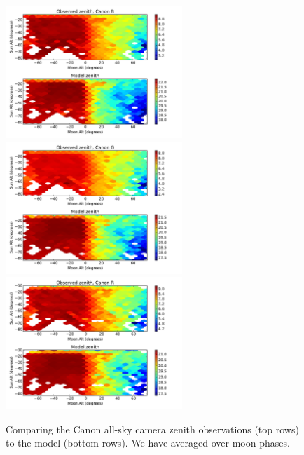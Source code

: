 \documentclass[]{spie}
\begin{document}
\begin{figure}[ht]
  \begin{center}
  \includegraphics[height=5cm]{plots/simple_zenith_comp_B.pdf} 
  \includegraphics[height=5cm]{plots/simple_zenith_comp_G.pdf} 
  \includegraphics[height=5cm]{plots/simple_zenith_comp_R.pdf}
  \end{center}
  \caption{Comparing the Canon all-sky camera zenith observations (top rows) to the model (bottom rows). We have averaged over moon phases.  \label{fig:compareZenithCanon}}
\end{figure}
\end{document}
